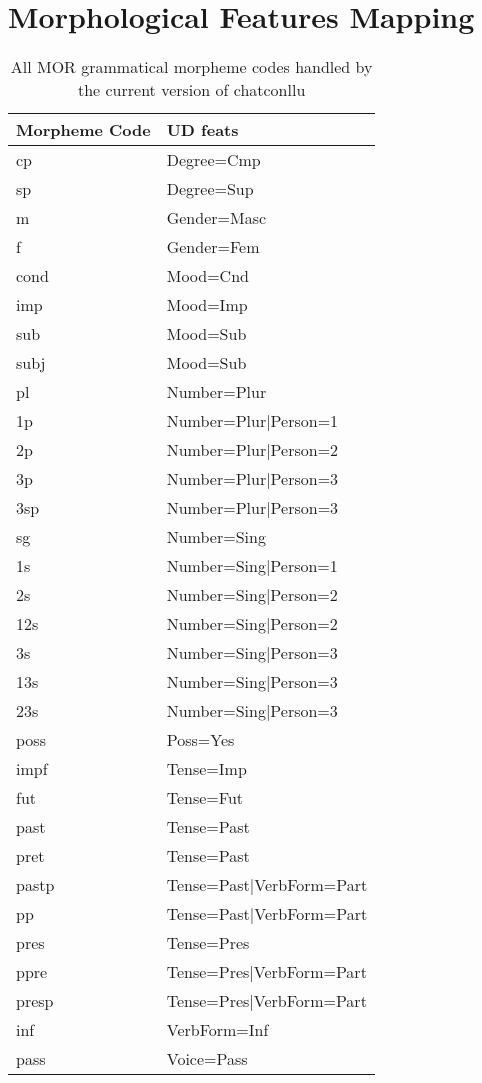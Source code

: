\section{Morphological Features Mapping}
\begin{table}[h!]
\caption {All MOR grammatical morpheme codes handled by the current version of chatconllu} \label{tab:featsmap}
\centering
\begin{tabularx}{\linewidth}{@{}lX@{}}
\toprule
\textbf{Morpheme Code} & \textbf{UD feats}\\ \midrule
	cp & Degree=Cmp\\
	sp & Degree=Sup\\\addlinespace
	m & Gender=Masc\\
	f & Gender=Fem\\\addlinespace
	cond & Mood=Cnd\\
	imp & Mood=Imp\\
	sub & Mood=Sub\\
	subj & Mood=Sub\\\addlinespace
	pl & Number=Plur\\
	1p & Number=Plur|Person=1\\
	2p & Number=Plur|Person=2\\
	3p & Number=Plur|Person=3\\
	3sp & Number=Plur|Person=3\\
	sg & Number=Sing\\
	1s & Number=Sing|Person=1\\
	2s & Number=Sing|Person=2\\
	12s & Number=Sing|Person=2\\
	3s & Number=Sing|Person=3\\
	13s & Number=Sing|Person=3\\
	23s & Number=Sing|Person=3\\\addlinespace
	poss & Poss=Yes\\\addlinespace
	impf & Tense=Imp\\
	fut & Tense=Fut\\
	past & Tense=Past\\
	pret & Tense=Past\\
	pastp & Tense=Past|VerbForm=Part\\
	pp & Tense=Past|VerbForm=Part\\
	pres & Tense=Pres\\
	ppre & Tense=Pres|VerbForm=Part\\
	presp & Tense=Pres|VerbForm=Part\\\addlinespace
	inf & VerbForm=Inf\\\addlinespace
	pass & Voice=Pass\\\bottomrule
\end{tabularx}
\end{table}


